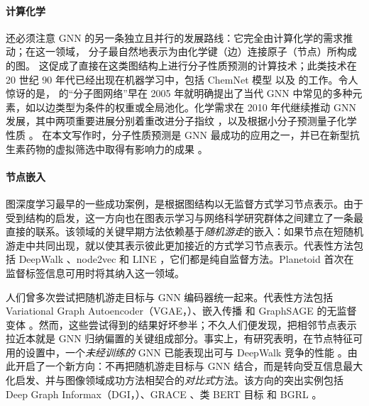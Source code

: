 \paragraph{计算化学}
还必须注意 GNN 的另一条独立且并行的发展路线：它完全由计算化学的需求推动；在这一领域，
分子最自然地表示为由化学键（边）连接原子（节点）所构成的图。
这促成了直接在这类图结构上进行分子性质预测的计算技术；此类技术在 20 世纪 90 年代已经出现在机器学习中，包括 ChemNet 模型%
\cite{kireev1995chemnet} 以及%
\cite{baskin1997neural} 的工作。令人惊讶的是，\cite{merkwirth2005automatic} 的“分子图网络”早在 2005 年就明确提出了当代 GNN 中常见的多种元素，如以边类型为条件的权重或全局池化。化学需求在 2010 年代继续推动 GNN 发展，其中两项重要进展分别着重改进分子指纹 \citep{duvenaud2015convolutional}，以及根据小分子预测量子化学性质 \citep{gilmer2017neural}。
在本文写作时，分子性质预测是 GNN 最成功的应用之一，并已在新型抗生素药物的虚拟筛选中取得有影响力的成果 \citep{stokes2020deep}。



\paragraph{节点嵌入} 图深度学习最早的一些成功案例，是根据图结构以无监督方式学习节点表示。由于受到结构的启发，这一方向也在图表示学习与网络科学研究群体之间建立了一条最直接的联系。该领域的关键早期方法依赖基于\emph{随机游走}的嵌入：如果节点在短随机游走中共同出现，就以使其表示彼此更加接近的方式学习节点表示。代表性方法包括 DeepWalk \citep{perozzi2014deepwalk}、node2vec \citep{grover2016node2vec} 和 LINE \citep{tang2015line}，它们都是纯自监督方法。Planetoid \citep{yang2016revisiting} 首次在监督标签信息可用时将其纳入这一领域。

人们曾多次尝试把随机游走目标与 GNN 编码器统一起来。代表性方法包括 Variational Graph Autoencoder（VGAE，\cite{kipf2016variational}）、嵌入传播 \citep{garcia2017learning} 和 GraphSAGE 的无监督变体 \citep{hamilton2017inductive}。然而，这些尝试得到的结果好坏参半；不久人们便发现，把相邻节点表示拉近本就是 GNN 归纳偏置的关键组成部分。事实上，有研究表明，在节点特征可用的设置中，一个\emph{未经训练的} GNN 已能表现出可与 DeepWalk 竞争的性能 \citep{velickovic2019deep,wu2019simplifying}。由此开启了一个新方向：不再把随机游走目标与 GNN 结合，而是转向受互信息最大化启发、并与图像领域成功方法相契合的\emph{对比式}方法。该方向的突出实例包括 Deep Graph Informax（DGI，\cite{velickovic2019deep}）、GRACE \citep{zhu2020deep}、类 BERT 目标 \citep{hu2020strategies} 和 BGRL \citep{thakoor2021bootstrapped}。

